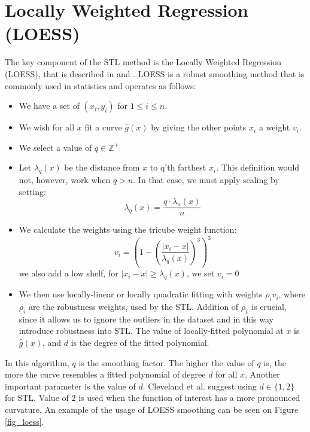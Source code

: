 \documentclass[main.tex]{subfiles}
\begin{document}
\section{Locally Weighted Regression (LOESS)}
\label{sec:locally_weighted_running_line_smoother}
The key component of the STL method is the Locally Weighted Regression (LOESS),
that is described in \cite{loess} and \cite{stl}. LOESS is a robust smoothing method that is
commonly used in statistics and operates as follows:
\begin{itemize}
\item We have a set of $(x_i, y_i)$ for $1 \leq i \leq n$.
\item We wish for all $x$ fit a curve $\hat{g}(x)$ by giving the other points $x_i$ a
  weight $v_i$.
\item We select a value of $q \in \mathbb{Z}^+$
\item Let $\lambda_q(x)$ be the distance from $x$ to q'th farthest $x_i$.
  This definition would not, however, work when $q > n$. In that case, we must
  apply scaling by setting:
  \[
  \lambda_q(x) = \frac{q \cdot \lambda_n(x)}{n}
  \]
\item We calculate the weights using the tricube weight function:
  \[
  v_i = \left( 1 - \left( \frac{| x_i - x |}{\lambda_q(x)}  \right)^3\right)^3
  \]
  we also add a low shelf, for $| x_i - x | \geq \lambda_q(x)$, we set $v_i = 0$
\item We then use locally-linear or locally quadratic fitting with weights
  $\rho_i v_i$, where $\rho_i$ are the robustness weights, used by the STL.
  Addition of $\rho_v$ is crucial, since it allows us to ignore the outliers
  in the dataset and in this way introduce robustness into STL.
  The value of locally-fitted polynomial at $x$ is $\hat{g}(x)$, and $d$ is
  the degree of the fitted polynomial.
\end{itemize}
In this algorithm, $q$ is the smoothing factor. The higher the value of $q$ is, the more
the curve resembles a fitted polynomial of degree $d$ for all $x$. Another
important parameter is the value of $d$. Cleveland et al.
\cite{stl} suggest using $d \in \{1,2\}$ for STL. Value of $2$ is used when the
function of interest has a more pronounced curvature. An example of the usage of
LOESS smoothing can be seen on Figure \ref{fig_loess}.
\end{document}
